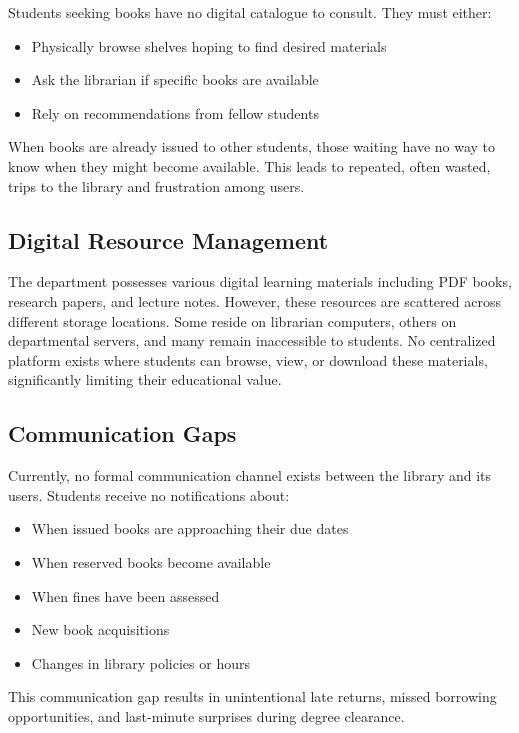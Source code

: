 \documentclass[12pt,a4paper]{report}
\begin{document}
Students seeking books have no digital catalogue to consult. They must either:

\begin{itemize}
    \item Physically browse shelves hoping to find desired materials
    \item Ask the librarian if specific books are available
    \item Rely on recommendations from fellow students
\end{itemize}

When books are already issued to other students, those waiting have no way to know when they might become available. This leads to repeated, often wasted, trips to the library and frustration among users.

\subsection{Digital Resource Management}

The department possesses various digital learning materials including PDF books, research papers, and lecture notes. However, these resources are scattered across different storage locations. Some reside on librarian computers, others on departmental servers, and many remain inaccessible to students. No centralized platform exists where students can browse, view, or download these materials, significantly limiting their educational value.

\subsection{Communication Gaps}

Currently, no formal communication channel exists between the library and its users. Students receive no notifications about:

\begin{itemize}
    \item When issued books are approaching their due dates
    \item When reserved books become available
    \item When fines have been assessed
    \item New book acquisitions
    \item Changes in library policies or hours
\end{itemize}

This communication gap results in unintentional late returns, missed borrowing opportunities, and last-minute surprises during degree clearance.
\end{document}
